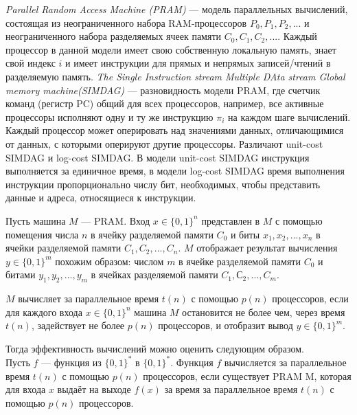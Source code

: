 \documentclass{spbau-diploma}
\begin{document}
\textit{Parallel Random Access Machine (PRAM)} --- модель параллельных вычислений, состоящая из неограниченного набора RAM-процессоров $P_0, P_1, P_2, ... $ и неограниченного набора разделяемых ячеек памяти $C_0, C_1, C_2, ... $. Каждый процессор в данной модели имеет свою собственную локальную память, знает свой индекс $i$ и имеет инструкции для прямых и непрямых записей/чтений в разделяемую память. \textit{The Single Instruction stream Multiple DAta stream Global memory machine(SIMDAG)} --- разновидность модели PRAM, где счетчик команд (регистр PC) общий для всех процессоров, например, все активные процессоры исполняют одну и ту же инструкцию $\pi_i$ на каждом шаге вычислений. Каждый процессор может оперировать над значениями данных, отличающимися от данных, с которыми оперируют другие процессоры. Различают unit-cost SIMDAG и log-cost SIMDAG. В модели unit-cost SIMDAG инструкция выполняется за единичное время, в модели log-cost SIMDAG время выполнения инструкции пропорционально числу бит, необходимых, чтобы представить данные и адреса, относящиеся к инструкции.

Пусть машина $M$ --- PRAM. Вход $x \in {\{0, 1\}}^n$ представлен в $M$ с помощью помещения числа $n$ в ячейку разделяемой памяти $C_0$ и биты $x_1, x_2, ..., x_n$ в ячейки разделяемой памяти $C_1, C_2, ..., C_n$. $M$ отображает результат вычисления $y \in {\{0, 1\}}^m$ похожим образом: числом $m$ в ячейке разделяемой памяти $C_0$ и битами $y_1, y_2, ..., y_m$ в ячейках разделяемой памяти $C_1,  С_2, ..., C_m$. 

$M$ вычисляет за параллельное время $t(n)$ с помощью $p(n)$ процессоров, если для каждого входа $x \in {\{0, 1\}}^n$ машина $M$ остановится не более чем, через время $t(n)$, задействует не более $p(n)$ процессоров, и отобразит вывод $y \in {\{0, 1\}}^m$.

Тогда эффективность вычислений можно оценить следующим образом.
\\Пусть  $f$ --- функция из $ {\{0, 1\}}^*$ в $ {\{0, 1\}}^*$. Функция $f$ вычисляется за параллельное время $t(n)$ с помощью $p(n)$ процессоров, если существует PRAM M, которая для входа $x$ выдаёт на выходе $f(x)$ за время за параллельное время $t(n)$ с помощью $p(n)$ процессоров.
\end{document}
